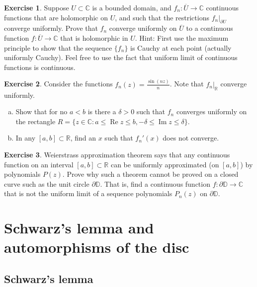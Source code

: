 \documentclass[12pt,openany]{book}
\renewcommand{\Re}{\operatorname{Re}}
\renewcommand{\Im}{\operatorname{Im}}
\newcommand{\C}{{\mathbb{C}}}
\newcommand{\R}{{\mathbb{R}}}
\newcommand{\D}{{\mathbb{D}}}
\theoremstyle{plain}
\theoremstyle{remark}
\theoremstyle{definition}
\newenvironment{exbox}{%
    \def\FrameCommand{\vrule width 1pt \relax\hspace {10pt}}%
    \MakeFramed {\advance \hsize -\width \FrameRestore }%
}{%
    \endMakeFramed
}
\newenvironment{exparts}{%
    \leavevmode\begin{enumerate}[a),noitemsep,topsep=0pt,parsep=0pt,partopsep=0pt]
}{%
    \end{enumerate}
}
\theoremstyle{exercise}
\newtheorem{exercise}{Exercise}[section]
\theoremstyle{example}
\begin{document}
\begin{exbox}
\begin{exercise}
Suppose $U \subset \C$ is a bounded domain, and $f_n \colon \overline{U} \to
\C$ continuous functions that are holomorphic on $U$, and such that
the restrictions $f_n|_{\partial U}$ converge uniformly.  Prove that
$f_n$ converge uniformly on $\overline{U}$ to a continuous
function $f \colon \overline{U} \to \C$ that is holomorphic in $U$.
Hint: First use the maximum principle to show that the sequence
$\{ f_n \}$
is Cauchy at each point (actually uniformly Cauchy).  Feel free to use the
fact that uniform limit of continuous functions is continuous.
\end{exercise}

\begin{exercise}
Consider the functions $f_n(z) = \frac{\sin(nz)}{n}$.  Note that $f_n|_{\R}$ converge
uniformly.
\begin{exparts}
\item
Show that for no $a < b$ is there a $\delta > 0$ such that
$f_n$ converges uniformly on the rectangle $R = \bigl\{ z \in \C : a \leq \Re z
\leq b , -\delta \leq \Im z \leq \delta \bigr\}$.
\item
In any $[a,b] \subset \R$, find 
an $x$ such that $f_n'(x)$ does not converge.
\end{exparts}
\end{exercise}

\begin{exercise}
Weierstrass approximation theorem says that any continuous function on an
interval $[a,b] \subset \R$ can be uniformly approximated (on $[a,b]$) by
polynomials $P(z)$.  Prove why such a theorem cannot be proved
on a closed curve such as the unit circle $\partial \D$.  That is,
find a continuous function $f \colon \partial \D \to \C$ that is
not the uniform limit of a sequence polynomials $P_n(z)$ on $\partial \D$.
\end{exercise}
\end{exbox}


\section{Schwarz's lemma and automorphisms of the disc}
\label{sec:schwarz}

\subsection{Schwarz's lemma}
\end{document}
